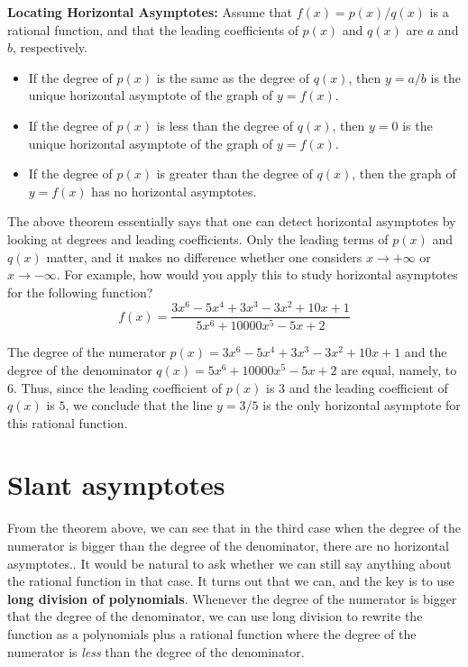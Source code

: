 \documentclass{ximera}
\begin{document}
\begin{theorem}
  {\bf Locating Horizontal Asymptotes:} Assume that $f(x) = p(x)/q(x)$ is a rational function, and that the leading coefficients of $p(x)$ and $q(x)$ are $a$ and $b$, respectively.
  \begin{itemize}
  \item If the degree of $p(x)$ is the same as the degree of $q(x)$, then $y=a/b$ is the unique horizontal asymptote of the graph of $y=f(x)$.
  \item If the degree of $p(x)$ is less than the degree of $q(x)$, then $y=0$ is the unique horizontal asymptote of the graph of $y=f(x)$.
  \item If the degree of $p(x)$ is greater than the degree of $q(x)$, then the graph of $y=f(x)$ has no horizontal asymptotes.
  \end{itemize}
\end{theorem}

The above theorem essentially says that one can detect horizontal asymptotes by looking at degrees and leading coefficients. Only the leading terms of $p(x)$ and $q(x)$ matter, and it makes no difference whether one considers $x\to +\infty$ or $x\to -\infty$. For example, how would you apply this to study horizontal asymptotes for the following function? $$ f(x) =  \frac{3x^6-5x^4+3x^3-3x^2 + 10x + 1}{5x^6 + 10000x^5 - 5x+2}$$

\begin{explanation}
  The degree of the numerator $p(x) = 3x^6-5x^4+3x^3-3x^2 + 10x + 1$ and the degree of the denominator $q(x) = 5x^6 + 10000x^5 - 5x+2$ are equal, namely, to $6$. Thus, since the leading coefficient of $p(x)$ is $3$ and the leading coefficient of $q(x)$ is $5$, we conclude that the line $y=3/5$ is the only horizontal asymptote for this rational function.
\end{explanation}


\section{Slant asymptotes}

From the theorem above, we can see that in the third case when the degree of the numerator is bigger than the degree of the denominator, there are no horizontal asymptotes..  It would be natural to ask whether we can still say anything about the rational function in that case.  It turns out that we can, and the key is to use \textbf{long division of polynomials}.  Whenever the degree of the numerator is bigger that the degree of the denominator, we can use long division to rewrite the function as a polynomials plus a rational function where the degree of the numerator is \textit{less} than the degree of the denominator. 
\end{document}
